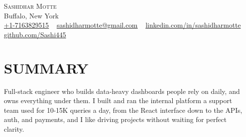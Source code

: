 \documentclass[letterpaper,11pt]{article}
\begin{document}
\begin{center}
    {\Huge \scshape Sashidhar Motte} \\ \vspace{1pt}
    Buffalo, New York \\ \vspace{1pt}
    \small 
    \href{tel:+17163829515}{\underline{+1-7163829515}} ~ 
    \href{mailto:sashidharmotte@gmail.com}{\underline{sashidharmotte@gmail.com}} ~  
    \href{https://www.linkedin.com/in/sashidharmotte/}{\underline{linkedin.com/in/sashidharmotte}} ~ 
    \href{https://github.com/Sashi445}{\underline{github.com/Sashi445}}
    \vspace{-8pt}
\end{center}
\section{SUMMARY}
\small{Full-stack engineer who builds data-heavy dashboards people rely on daily, and owns everything under them. I built and ran the internal platform a support team used for 10-15K queries a day, from the React interface down to the APIs, auth, and payments, and I like driving projects without waiting for perfect clarity.}
\vspace{-6pt}
\end{document}
